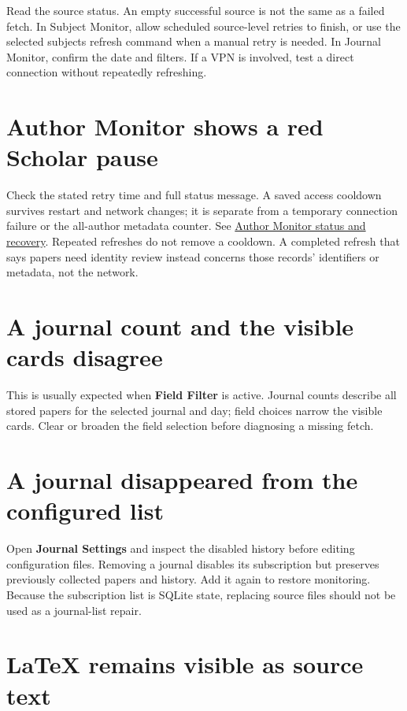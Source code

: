 \documentclass[10pt,letterpaper,oneside]{scrreprt}
\begin{document}
Read the source status. An empty successful source is not the same as a failed fetch. In Subject Monitor, allow scheduled source-level retries to finish, or use the selected subject\textquotesingle s refresh command when a manual retry is needed. In Journal Monitor, confirm the date and filters. If a VPN is involved, test a direct connection without repeatedly refreshing.

\section{Author Monitor shows a red Scholar pause}\label{author-monitor-shows-a-red-scholar-pause}

Check the stated retry time and full status message. A saved access cooldown survives restart and network changes; it is separate from a temporary connection failure or the all-author metadata counter. See \hyperref[author-monitor]{Author Monitor status and recovery}. Repeated refreshes do not remove a cooldown. A completed refresh that says papers need identity review instead concerns those records' identifiers or metadata, not the network.

\section{A journal count and the visible cards disagree}\label{a-journal-count-and-the-visible-cards-disagree}

This is usually expected when \textbf{Field Filter} is active. Journal counts describe all stored papers for the selected journal and day; field choices narrow the visible cards. Clear or broaden the field selection before diagnosing a missing fetch.

\section{A journal disappeared from the configured list}\label{a-journal-disappeared-from-the-configured-list}

Open \textbf{Journal Settings} and inspect the disabled history before editing configuration files. Removing a journal disables its subscription but preserves previously collected papers and history. Add it again to restore monitoring. Because the subscription list is SQLite state, replacing source files should not be used as a journal-list repair.

\section{LaTeX remains visible as source text}\label{latex-remains-visible-as-source-text}
\end{document}
